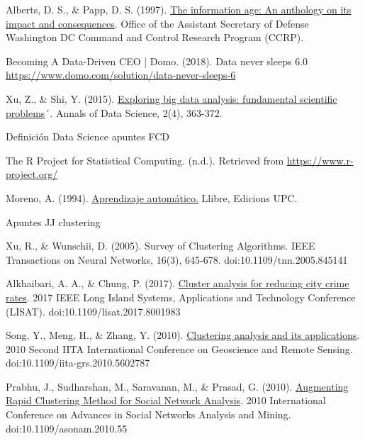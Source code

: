 \documentclass[10pt, a4paper]{article}
\begin{document}
\begin{thebibliography}{X}

 Alberts, D. S., \& Papp, D. S. (1997). \href{http://www.dodccrp.org/files/Alberts_Anthology_I.pdf} {The information age: An anthology on its impact and consequences}. Office of the Assistant Secretary of Defense Washington DC Command and Control Research Program (CCRP).

 Becoming A Data-Driven CEO | Domo. (2018). Data never sleeps 6.0 \href{https://www.domo.com/solution/data-never-sleeps-6} {https://www.domo.com/solution/data-never-sleeps-6}

 Xu, Z., \& Shi, Y. (2015). \href {https://link.springer.com/content/pdf/10.1007/s40745-015-0063-7.pdf} {Exploring big data analysis: fundamental scientific problems}´. Annals of Data Science, 2(4), 363-372.

 Definición Data Science apuntes FCD

 The R Project for Statistical Computing. (n.d.). Retrieved from \href{https://www.r-project.org/} {https://www.r-project.org/}

 Moreno, A. (1994). \href{https://upcommons.upc.edu/bitstream/handle/2099.3/36157/9788483019962.pdf?sequence=1&isAllowed=y} {Aprendizaje automático.} Llibre, Edicions UPC.

 Apuntes JJ clustering

 Xu, R., \& Wunschii, D. (2005). Survey of Clustering Algorithms. IEEE Transactions on Neural Networks, 16(3), 645-678. doi:10.1109/tnn.2005.845141

 Alkhaibari, A. A., \& Chung, P. (2017). \href{https://ieeexplore.ieee.org/document/8001983} {Cluster analysis for reducing city crime rates}. 2017 IEEE Long Island Systems, Applications and Technology Conference (LISAT). doi:10.1109/lisat.2017.8001983

 Song, Y., Meng, H., \& Zhang, Y. (2010). \href{https://ieeexplore.ieee.org/document/5602787} {Clustering analysis and its applications}. 2010 Second IITA International Conference on Geoscience and Remote Sensing. doi:10.1109/iita-grs.2010.5602787

 Prabhu, J., Sudharshan, M., Saravanan, M., \& Prasad, G. (2010). \href{https://ieeexplore.ieee.org/document/5563072} {Augmenting Rapid Clustering Method for Social Network Analysis}. 2010 International Conference on Advances in Social Networks Analysis and Mining. doi:10.1109/asonam.2010.55


\end{thebibliography}
\end{document}
